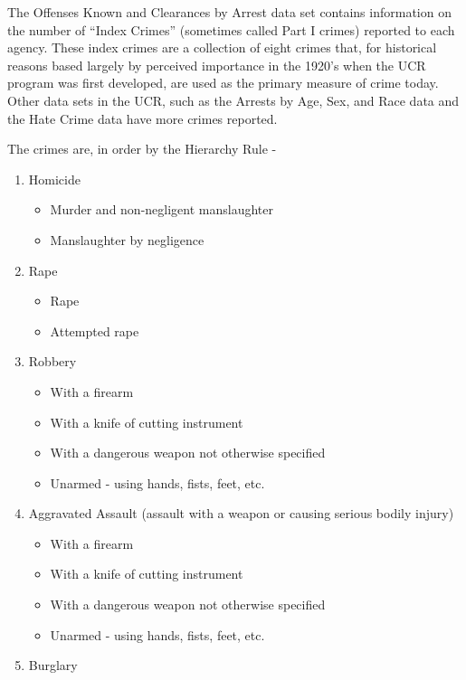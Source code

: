 \documentclass[
  12pt,
  openany]{book}
\providecommand{\tightlist}{%
  \setlength{\itemsep}{0pt}\setlength{\parskip}{0pt}}
\begin{document}
The Offenses Known and Clearances by Arrest data set contains information on the number of ``Index Crimes'' (sometimes called Part I crimes) reported to each agency. These index crimes are a collection of eight crimes that, for historical reasons based largely by perceived importance in the 1920's when the UCR program was first developed, are used as the primary measure of crime today. Other data sets in the UCR, such as the Arrests by Age, Sex, and Race data and the Hate Crime data have more crimes reported.

The crimes are, in order by the Hierarchy Rule -

\begin{enumerate}
\def\labelenumi{\arabic{enumi}.}
\tightlist
\item
  Homicide

  \begin{itemize}
  \tightlist
  \item
    Murder and non-negligent manslaughter\\
  \item
    Manslaughter by negligence\\
  \end{itemize}
\item
  Rape

  \begin{itemize}
  \tightlist
  \item
    Rape\\
  \item
    Attempted rape\\
  \end{itemize}
\item
  Robbery

  \begin{itemize}
  \tightlist
  \item
    With a firearm\\
  \item
    With a knife of cutting instrument\\
  \item
    With a dangerous weapon not otherwise specified\\
  \item
    Unarmed - using hands, fists, feet, etc.\\
  \end{itemize}
\item
  Aggravated Assault (assault with a weapon or causing serious bodily injury)

  \begin{itemize}
  \tightlist
  \item
    With a firearm\\
  \item
    With a knife of cutting instrument\\
  \item
    With a dangerous weapon not otherwise specified\\
  \item
    Unarmed - using hands, fists, feet, etc.\\
  \end{itemize}
\item
  Burglary


\end{enumerate}
\end{document}
